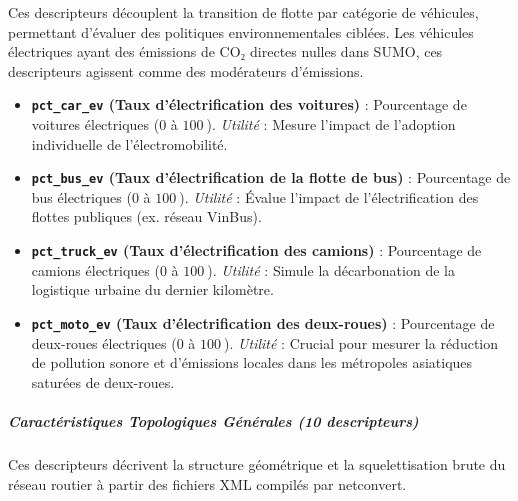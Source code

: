 \documentclass[10pt, a4paper]{article}
\providecommand{\tightlist}{}
\begin{document}
Ces descripteurs découplent la transition de flotte par catégorie de
véhicules, permettant d'évaluer des politiques environnementales
ciblées. Les véhicules électriques ayant des émissions de CO₂ directes
nulles dans SUMO, ces descripteurs agissent comme des modérateurs
d'émissions.

\begin{itemize}
\tightlist
\item
  \textbf{\texttt{pct\_car\_ev} (Taux d'électrification des voitures)} :
  Pourcentage de voitures électriques (\(0\) à \(100\ %
  \)). \emph{Utilité} : Mesure l'impact de l'adoption individuelle de
  l'électromobilité.
\item
  \textbf{\texttt{pct\_bus\_ev} (Taux d'électrification de la flotte de
  bus)} : Pourcentage de bus électriques (\(0\) à \(100\ %
  \)). \emph{Utilité} : Évalue l'impact de l'électrification des flottes
  publiques (ex. réseau VinBus).
\item
  \textbf{\texttt{pct\_truck\_ev} (Taux d'électrification des camions)}
  : Pourcentage de camions électriques (\(0\) à \(100\ %
  \)). \emph{Utilité} : Simule la décarbonation de la logistique urbaine
  du dernier kilomètre.
\item
  \textbf{\texttt{pct\_moto\_ev} (Taux d'électrification des
  deux-roues)} : Pourcentage de deux-roues électriques (\(0\) à \(100\ %
  \)). \emph{Utilité} : Crucial pour mesurer la réduction de pollution
  sonore et d'émissions locales dans les métropoles asiatiques saturées
  de deux-roues.
\end{itemize}

\subparagraph{Caractéristiques Topologiques Générales (10
descripteurs)}\label{caractuxe9ristiques-topologiques-guxe9nuxe9rales-10-descripteurs}

Ces descripteurs décrivent la structure géométrique et la
squelettisation brute du réseau routier à partir des fichiers XML
compilés par netconvert.
\end{document}
